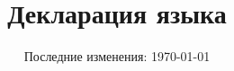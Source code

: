 

\title{Декларация языка}
\author{}
\date{Последние изменения: \today}


  \maketitle\newpage
  \tableofcontents\newpage

  
  


